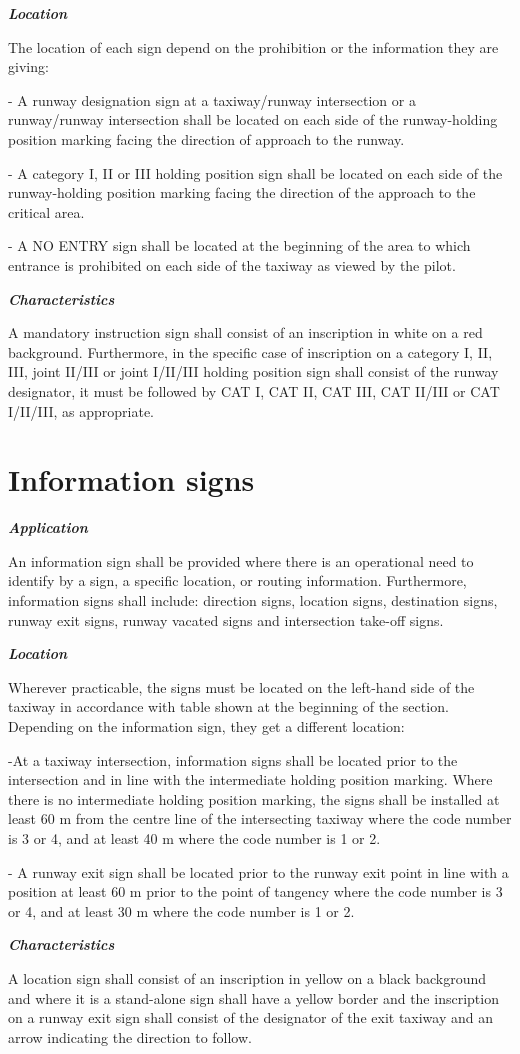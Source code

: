 	\textbf{\textit{Location}}
	
	The location of each sign depend on the prohibition or the information they are giving:
	
	- A runway designation sign at a taxiway/runway intersection or a runway/runway intersection shall be located on each side of the runway-holding position marking facing the direction of approach to the runway.
	
	- A category I, II or III holding position sign shall be located on each side of the runway-holding position marking facing the direction of the approach to the critical area.
	
	- A NO ENTRY sign shall be located at the beginning of the area to which entrance is prohibited on each side of the taxiway as viewed by the pilot.
	
	\textbf{\textit{Characteristics}}
	
	A mandatory instruction sign shall consist of an inscription in white on a red background. Furthermore, in the specific case of inscription on a category I, II, III, joint II/III or joint I/II/III holding position sign shall consist of the runway designator, it must be followed by CAT I, CAT II, CAT III, CAT II/III or CAT I/II/III, as appropriate.
	
	\section{Information signs}
	\textbf{\textit{Application}}
	
	An information sign shall be provided where there is an operational need to identify by a sign, a specific location, or routing information. Furthermore, information signs shall include: direction signs, location signs, destination signs, runway exit signs, runway vacated signs and intersection take-off signs.
	
	\textbf{\textit{Location}}
	
	Wherever practicable, the signs must be located on the left-hand side of the taxiway in accordance with table shown at the beginning of the section. Depending on the information sign, they get a different location:
	
	-At a taxiway intersection, information signs shall be located prior to the intersection and in line with the intermediate holding position marking. Where there is no intermediate holding position marking, the signs shall be installed at least 60 m from the centre line of the intersecting taxiway where the code number is 3 or 4, and at least 40 m where the code number is 1 or 2.
	
	- A runway exit sign shall be located prior to the runway exit point in line with a position at least 60 m prior to the point of tangency where the code number is 3 or 4, and at least 30 m where the code number is 1 or 2.
	
	\textbf{\textit{Characteristics}}
	
	A location sign shall consist of an inscription in yellow on a black background and where it is a stand-alone sign shall have a yellow border and the inscription on a runway exit sign shall consist of the designator of the exit taxiway and an arrow indicating the direction to follow.
	
	